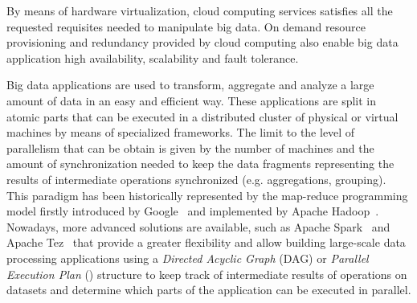 

By means of hardware virtualization, cloud computing services satisfies all the requested requisites needed to manipulate big data. On demand resource provisioning and redundancy provided by cloud computing also enable big data application high availability, scalability and fault tolerance.

Big data applications are used to transform, aggregate and analyze a large amount of data in an easy and efficient way. These applications are split in atomic parts that can be executed in a distributed cluster of physical or virtual machines by means of specialized frameworks. The limit to the level of parallelism that can be obtain is given by the number of machines and the amount of synchronization needed to keep the data fragments representing the results of intermediate operations synchronized (e.g. aggregations, grouping). This paradigm has been historically represented by the map-reduce programming model firstly introduced by Google~\cite{misc:GoogleMapReduce} and implemented by Apache Hadoop~\cite{misc:ApacheHadoop}. Nowadays, more advanced solutions are available, such as Apache Spark~\cite{misc:ApacheSpark} and Apache Tez~\cite{misc:ApacheTez} that provide a greater flexibility and allow building large-scale data processing applications using a \textit{Directed Acyclic Graph} (DAG) or \textit{Parallel Execution Plan} (\plan) structure to keep track of intermediate results of operations on datasets and determine which parts of the application can be executed in parallel.

